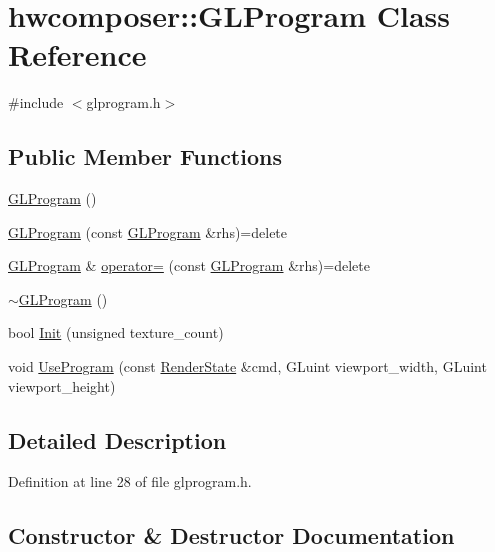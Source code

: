 \hypertarget{classhwcomposer_1_1GLProgram}{}\section{hwcomposer\+:\+:G\+L\+Program Class Reference}
\label{classhwcomposer_1_1GLProgram}


{\ttfamily \#include $<$glprogram.\+h$>$}

\subsection*{Public Member Functions}
\begin{DoxyCompactItemize}
\item 
\mbox{\hyperlink{classhwcomposer_1_1GLProgram_a845d1b2a0bd592416096deb38fde602a}{G\+L\+Program}} ()
\item 
\mbox{\hyperlink{classhwcomposer_1_1GLProgram_ac6d8b653f16b95ef5d46aa6bbb6f692b}{G\+L\+Program}} (const \mbox{\hyperlink{classhwcomposer_1_1GLProgram}{G\+L\+Program}} \&rhs)=delete
\item 
\mbox{\hyperlink{classhwcomposer_1_1GLProgram}{G\+L\+Program}} \& \mbox{\hyperlink{classhwcomposer_1_1GLProgram_a59c20c8a8960d691d6962777922d2c20}{operator=}} (const \mbox{\hyperlink{classhwcomposer_1_1GLProgram}{G\+L\+Program}} \&rhs)=delete
\item 
\mbox{\hyperlink{classhwcomposer_1_1GLProgram_a5ff19da08cd1ebf54338891adb2b86e9}{$\sim$\+G\+L\+Program}} ()
\item 
bool \mbox{\hyperlink{classhwcomposer_1_1GLProgram_acdb8a88311314231b1dfcd001dea4c36}{Init}} (unsigned texture\+\_\+count)
\item 
void \mbox{\hyperlink{classhwcomposer_1_1GLProgram_a59b867819bd92a020986adf4da964892}{Use\+Program}} (const \mbox{\hyperlink{structhwcomposer_1_1RenderState}{Render\+State}} \&cmd, G\+Luint viewport\+\_\+width, G\+Luint viewport\+\_\+height)
\end{DoxyCompactItemize}


\subsection{Detailed Description}


Definition at line 28 of file glprogram.\+h.



\subsection{Constructor \& Destructor Documentation}
\mbox{\label{classhwcomposer_1_1GLProgram_a845d1b2a0bd592416096deb38fde602a}} 
